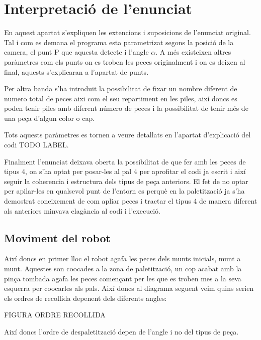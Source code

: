 \section{Interpretació de l'enunciat}
En aquest apartat s'expliquen les extencions i suposicions de l'enunciat original.
Tal i com es demana el programa esta parametrizat segons la posició de la camera,
el punt P que aquesta detecte i l'angle $\alpha$. A més existeixen altres paràmetres
com els punts on es troben les peces originalment i on es deixen al final, aquests
s'explicaran a l'apartat de punts.

Per altra banda s'ha introduït la possibilitat de fixar un nombre diferent de numero
total de peces aixi com el seu repartiment en les piles, així doncs es poden tenir 
piles amb diferent número de peces i la possibilitat de tenir més de una peça
d'algun color o cap.

Tots aquests paràmetres es tornen a veure detallats en l'apartat d'explicació del
codi TODO LABEL.

Finalment l'enunciat deixava oberta la possibilitat de que fer amb les peces de
tipus 4, on s'ha optat per posar-les al pal 4 per aprofitar el codi ja escrit i
així seguir la coherencia i estructura dels tipus de peça anteriors. El fet de
no optar per apilar-les en qualsevol punt de l'entorn es perquè en la paletització
ja s'ha demostrat coneixement de com apliar peces i tractar el tipus 4 de manera
diferent als anteriors minvava elagància al codi i l'execució.

\subsection{Moviment del robot}
Així doncs en primer lloc el robot agafa les peces dels munts inicials, munt a munt.
Aquestes son co\lgem ocades a la zona de paletització, un cop acabat amb la pinça
tombada agafa les peces començant per les que es troben mes a la seva esquerra
per co\lgem ocarles als pals. Així doncs al diagrama seguent veim quins serien
els ordres de recollida depenent dels diferents angles:

FIGURA ORDRE RECOLLIDA

Així doncs l'ordre de despaletització depen de l'angle i no del tipus de peça.